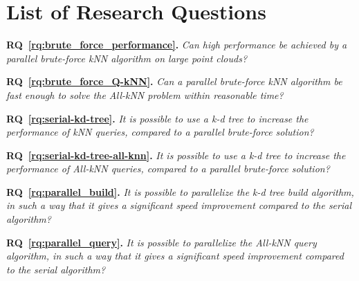 
\tableofcontents
{}
\clearpage

\listoftables
{}
\clearpage

\listoffigures
{}
\clearpage

\listofalgorithms
{}
\clearpage

\chapter*{List of Research Questions} %
\label{sec:section_name}


\textbf{RQ~\ref{rq:brute_force_performance}.} \emph{Can high performance be achieved by a parallel brute-force kNN algorithm on large point clouds?}

\textbf{RQ~\ref{rq:brute_force_Q-kNN}.} \emph{Can a parallel brute-force kNN algorithm be fast enough to solve the All-kNN problem within reasonable time?}

\textbf{RQ~\ref{rq:serial-kd-tree}.} \emph{It is possible to use a k-d tree to increase the performance of kNN queries, compared to a parallel brute-force solution?}

\textbf{RQ~\ref{rq:serial-kd-tree-all-knn}.} \emph{It is possible to use a k-d tree to increase the performance of All-kNN queries, compared to a parallel brute-force solution?}

\textbf{RQ~\ref{rq:parallel_build}.} \emph{It is possible to parallelize the k-d tree build algorithm, in such a way that it gives a significant speed improvement compared to the serial algorithm?}

\textbf{RQ~\ref{rq:parallel_query}.} \emph{It is possible to parallelize the All-kNN query algorithm, in such a way that it gives a significant speed improvement compared to the serial algorithm?}

\clearpage
